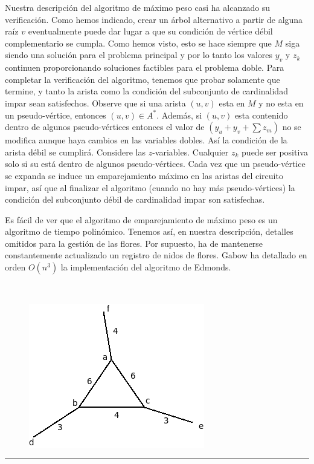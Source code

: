 \documentclass[10pt,a5paper]{book}
\begin{document}
Nuestra descripción del algoritmo de máximo peso casi ha alcanzado su verificación. Como hemos indicado, crear un árbol alternativo a partir de alguna raíz $v$ eventualmente puede dar lugar a que su condición de vértice débil complementario se cumpla. Como hemos visto, esto se hace siempre que $M$ siga siendo una solución para el problema principal y por lo tanto los valores $y_v$ y $z_k$ continuen proporcionando soluciones factibles para el problema doble. Para completar la verificación del algoritmo, tenemos que probar solamente que termine, y tanto la arista como la condición del subconjunto de cardinalidad impar sean satisfechos. Observe que si una arista $(u,v)$ esta en $M$ y no esta en un pseudo-vértice, entonces $(u,v) \in A^*$. Además, si $(u,v)$ esta contenido dentro de algunos pseudo-vértices entonces el valor de $(y_u + y_v + \sum z_m)$ no se modifica aunque haya cambios en las variables dobles. Así la condición de la arista débil se cumplirá. Considere las $z$-variables. Cualquier $z_k$ puede ser positiva solo si su está dentro de algunos pseudo-vértices. Cada vez que un pseudo-vértice se expanda se induce un emparejamiento máximo en las aristas del circuito impar, así que al finalizar el algoritmo (cuando no hay más pseudo-vértices) la condición del subconjunto débil de cardinalidad impar son satisfechas.

Es fácil de ver que el algoritmo de emparejamiento de máximo peso es un algoritmo de tiempo polinómico. Tenemos así, en nuestra descripción, detalles omitidos para la gestión de las flores. Por supuesto, ha de mantenerse constantemente actualizado un registro de nidos de flores. Gabow\cite{r} ha detallado en orden $O(n^3)$ la implementación del algoritmo de Edmonds.

\begin{figure}[H]
\caption{ }
\hrulefill{}\\
\begin{center}\includegraphics[scale=.5]{Fig4_13.png}\end{center}
\end{figure}
\hrule{}
\end{document}
